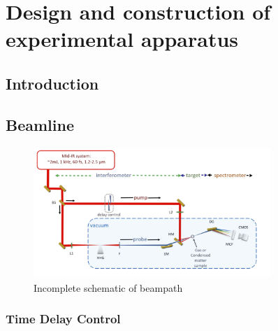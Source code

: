 \chapter{Design and construction of experimental apparatus}
\label{beamline}

\section{Introduction}
\label{intro_beamline}


\section{Beamline}
\label{sec:full_beamline}
\begin{figure}
	\centering
	\includegraphics[width=0.8\textwidth]{figures/Beamline/beampath_sketch.pdf}
	\caption{Incomplete schematic of beampath}
	\label{fig:beampath_sketch}
\end{figure}
\subsection{Time Delay Control}
\label{sec:delay_wedges}

